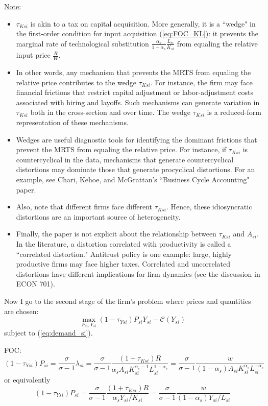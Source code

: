 \documentclass[12pt]{article}
\begin{document}
\underline{Note:}
\begin{itemize}
		\item $\tau_{Ksi}$ is akin to a tax on capital acquisition. More generally, it is a ``wedge" in the first-order condition for input acquisition (\ref{eq:FOC_KL}): it prevents the marginal rate of technological substitution $\frac{\alpha_s}{1-\alpha_s}\frac{L_{si}}{K_{si}}$ from equaling the relative input price $\frac{R}{W}$. 
		\item In other words, any mechanism that prevents the MRTS from equaling the relative price contributes to the wedge $\tau_{Ksi}$. For instance, the firm may face financial frictions that restrict capital adjustment or labor-adjustment costs associated with hiring and layoffs. Such mechanisms can generate variation in $\tau_{Ksi}$ both in the cross-section and over time. The wedge $\tau_{Ksi}$ is a reduced-form representation of these mechanisms.
		\item Wedges are useful diagnostic tools for identifying the dominant frictions that prevent the MRTS from equaling the relative price. For instance, if $\tau_{Ksi}$ is countercyclical in the data, mechanisms that generate countercyclical distortions may dominate those that generate procyclical distortions. For an example, see Chari, Kehoe, and McGrattan's ``Business Cycle Accounting" paper.  
	\item Also, note that different firms face different $\tau_{Ksi}$. Hence, these idiosyncratic distortions are an important source of heterogeneity.
		\item Finally, the paper is not explicit about the relationship between $\tau_{Ksi}$ and $A_{si}$. In the literature, a distortion correlated with productivity is called a ``correlated distortion." Antitrust policy is one example: large, highly productive firms may face higher taxes. Correlated and uncorrelated distortions have different implications for firm dynamics (see the discussion in ECON 701). 
\end{itemize}


	Now I go to the second stage of the firm's problem where prices and quantities are chosen:
	\[\max_{P_{si}, Y_{si}} (1-\tau_{Ysi})P_{si}Y_{si} - \mathcal{C}(Y_{si})\]
	subject to (\ref{eq:demand_si}).
	
	FOC:
	\begin{equation}
		(1-\tau_{Ysi}) P_{si} = \frac{\sigma}{\sigma - 1}\lambda_{si} = \frac{\sigma}{\sigma - 1} \frac{(1+\tau_{Ksi})R}{\alpha_s A_{si}K_{si}^{\alpha_s-1}L_{si}^{1-\alpha_s}} =  \frac{\sigma}{\sigma - 1} \frac{w}{(1-\alpha_s) A_{si}K_{si}^{\alpha_s}L_{si}^{-\alpha_s}}
	\end{equation}
	or equivalently
	\begin{equation} \label{eq:FOC_P}
		(1-\tau_{Ysi}) P_{si} = \frac{\sigma}{\sigma -1} \frac{(1+\tau_{Ksi}) R}{\alpha_s Y_{si}/K_{si}} = \frac{\sigma}{\sigma -1} \frac{w}{(1-\alpha_s) Y_{si}/L_{si}}
	\end{equation}
\end{document}
